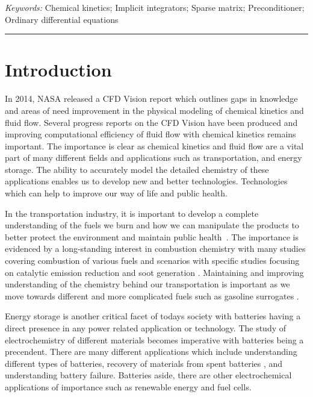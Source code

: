 \documentclass{article}
\newcommand{\sectionOne}[1]{\section{#1} \addvspace{10pt}}
\begin{document}
\vspace{10pt}
\parbox{1.0\textwidth}{\footnotesize {\em Keywords:}
Chemical kinetics; Implicit integrators; Sparse matrix; Preconditioner; Ordinary diﬀerential equations}
\rule{\textwidth}{0.5pt}
\vspace{10pt}



\clearpage


\sectionOne{Introduction}

In 2014, NASA released a CFD Vision report which outlines gaps in knowledge and areas of need improvement in the physical modeling of chemical kinetics and fluid flow\cite{slotnick_cfd_2014}.
Several progress reports on the CFD Vision have been produced and improving computational efficiency of fluid flow with chemical kinetics remains important\cite{cary_andrew_2022}.
The importance is clear as chemical kinetics and fluid flow are a vital part of many different fields and applications such as transportation, and energy storage.
The ability to accurately model the detailed chemistry of these applications enables us to develop new and better technologies.
Technologies which can help to improve our way of life and public health.

In the transportation industry, it is important to develop a complete understanding of the fuels we burn and how we can manipulate the products to better protect the environment and maintain public health~\cite{van_fan_review_2018, manisalidis_environmental_2020}.
The importance is evidenced by a long-standing interest in combustion chemistry with many studies covering combustion of various fuels and scenarios \cite{markatou1993computational, deutschmann1994modelling, bui1996homogeneous, aghalayam2003c1, lodeng2007catalytic, freund2010model, badra2013experimental} with specific studies focusing on catalytic emission reduction and soot generation \cite{koop2009detailed, luo20173d, mosbach2009towards}.
Maintaining and improving understanding of the chemistry behind our transportation is important as we move towards different and more complicated fuels such as gasoline surrogates \cite{mehl_kinetic_2011}.

Energy storage is another critical facet of todays society with batteries having a direct presence in any power related application or technology.
The study of electrochemistry of different materials becomes imperative with batteries being a precendent.
There are many different applications which include understanding different types of batteries\cite{vargas2016electrochemical, gallagher2009kinetic, FRONCZEK2013183}, recovery of materials from spent batteries \cite{setiawan2019reaction}, and understanding battery failure\cite{liu2018thermo}.
Batteries aside, there are other electrochemical applications of importance such as renewable energy \cite{snir2019progress} and fuel cells\cite{bazylak2005improved}.
\end{document}
